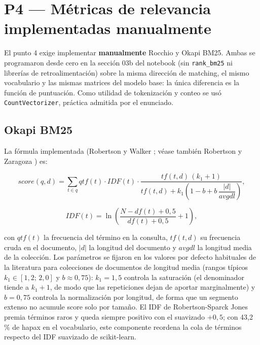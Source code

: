 \documentclass[11pt]{tg_usta}
\begin{document}
\section{P4 --- Métricas de relevancia implementadas manualmente}\label{sec:p4}

El punto 4 exige implementar \textbf{manualmente} Rocchio y Okapi BM25. Ambas se programaron desde cero en la sección 03b del notebook (sin \texttt{rank\_bm25} ni librerías de retroalimentación) sobre la misma dirección de matching, el mismo vocabulario y las mismas matrices del modelo base: la única diferencia es la función de puntuación. Como utilidad de tokenización y conteo se usó \texttt{CountVectorizer}, práctica admitida por el enunciado.

\subsection{Okapi BM25}

La fórmula implementada (Robertson y Walker \cite{robertson1994simple}; véase también Robertson y Zaragoza \cite{robertson2009probabilistic}) es:

\begin{equation}\label{eq:bm25}
score(q,d) = \sum_{t\in q} qtf(t)\cdot IDF(t)\cdot
\frac{tf(t,d)\,(k_1+1)}{tf(t,d)+k_1\!\left(1-b+b\,\dfrac{|d|}{avgdl}\right)},
\end{equation}

\begin{equation}\label{eq:bm25idf}
IDF(t) = \ln\!\left(\frac{N-df(t)+0{,}5}{df(t)+0{,}5}+1\right),
\end{equation}

\noindent con $qtf(t)$ la frecuencia del término en la consulta, $tf(t,d)$ su frecuencia cruda en el documento, $|d|$ la longitud del documento y $avgdl$ la longitud media de la colección. Los parámetros se fijaron en los valores por defecto habituales de la literatura para colecciones de documentos de longitud media (rangos típicos $k_1\in[1{,}2;\,2{,}0]$ y $b\approx 0{,}75$): $k_1=1{,}5$ controla la saturación (el denominador tiende a $k_1+1$, de modo que las repeticiones dejan de aportar marginalmente) y $b=0{,}75$ controla la normalización por longitud, de forma que un segmento extenso no acumule score solo por tamaño. El IDF de Robertson-Sparck Jones premia términos raros y queda siempre positivo con el suavizado $+0{,}5$; con 43,2\,\% de hapax en el vocabulario, este componente reordena la cola de términos respecto del IDF suavizado de scikit-learn.
\end{document}
